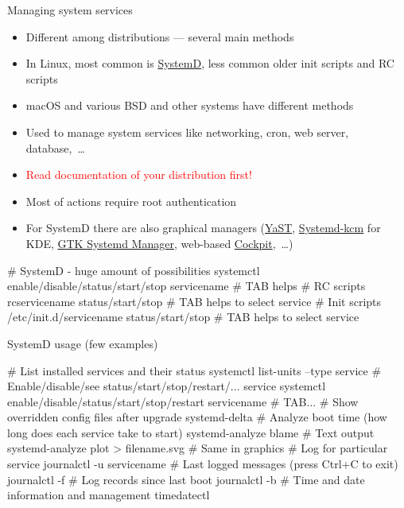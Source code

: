 \documentclass[compress, xelatex, 11pt, xcolor=svgnames, aspectratio=169,
	hyperref={
		bookmarks=true,
		unicode=true,
		colorlinks=true,
		pdftitle={Linux, command line and MetaCentrum},
		plainpages=false,
		pdfauthor={Vojtech Zeisek},
		pdfsubject={Course about use of Linux command line, writing shell scripts and using MetaCentrum of CESNET},
		pdfcreator={XeLaTeX},
		pdfkeywords={Linux, GNU, BASH, shell, command line, MetaCentrum},
		linkcolor=DarkRed, %
		anchorcolor=DarkBlue, %
		citecolor=Indigo, %
		filecolor=NavyBlue, %
		menucolor=DarkMagenta, %
		urlcolor=DarkBlue, %
		},
	url={hyphens, lowtilde} %
	]{beamer}
\renewcommand{\alert}[1]{\textcolor{red}{#1}}
\begin{document}
\begin{frame}[fragile]{Managing system services}
	\begin{itemize}
		\item Different among distributions --- several main methods
		\item In Linux, most common is \href{https://wiki.freedesktop.org/www/Software/systemd/}{SystemD}, less common older init scripts and RC scripts
		\item macOS and various BSD and other systems have different methods
		\item Used to manage system services like networking, cron, web server, database,~\ldots
		\item \alert{Read documentation of your distribution first!}
		\item Most of actions require root authentication
		\item For SystemD there are also graphical managers (\href{https://doc.opensuse.org/documentation/leap/reference/html/book-reference/cha-systemd.html#sec-boot-runlevel-edit}{YaST}, \href{https://store.kde.org/p/1127873/}{Systemd-kcm} for KDE, \href{https://github.com/GuillaumeGomez/systemd-manager}{GTK Systemd Manager}, web-based \href{https://cockpit-project.org/}{Cockpit},~\ldots)
	\end{itemize}
	\vfill
	\begin{bashcode}
    # SystemD - huge amount of possibilities
    systemctl enable/disable/status/start/stop servicename # TAB helps
    # RC scripts
    rcservicename status/start/stop # TAB helps to select service
    # Init scripts
    /etc/init.d/servicename status/start/stop # TAB helps to select service
	\end{bashcode}
\end{frame}

\begin{frame}[fragile]{SystemD usage (few examples)}
	\begin{bashcode}
    # List installed services and their status
    systemctl list-units --type service
    # Enable/disable/see status/start/stop/restart/... service
    systemctl enable/disable/status/start/stop/restart servicename # TAB...
    # Show overridden config files after upgrade
    systemd-delta
    # Analyze boot time (how long does each service take to start)
    systemd-analyze blame # Text output
    systemd-analyze plot > filename.svg # Same in graphics
    # Log for particular service
    journalctl -u servicename
    # Last logged messages (press Ctrl+C to exit)
    journalctl -f
    # Log records since last boot
    journalctl -b
    # Time and date information and management
    timedatectl
	\end{bashcode}
\end{frame}
\end{document}
